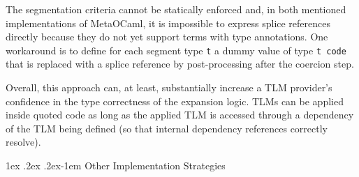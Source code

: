 \documentclass[acmsmall]{acmart}
\makeatletter
\renewcommand{\subsubsection}{%
  \@startsection{subsubsection}{3}%
  {\z@}{1ex \@plus .2ex \@minus .2ex}{-1em}%
  {\normalfont\normalsize\bfseries}%
}
\newcommand{\li}[1]{\lstinline[basicstyle=\ttfamily\fontsize{9pt}{1em}\selectfont]{#1}}
\makeatother
\begin{document}
The segmentation criteria cannot be statically enforced and, in both mentioned implementations of MetaOCaml, it is impossible to express splice references directly because they do not yet support terms with type annotations. One workaround is to define for each  segment type \li{t} a dummy value of type \li{t code} that is replaced with a splice reference by post-processing after the coercion step. 

Overall, this approach can, at least, substantially increase a TLM provider's confidence in the type correctness of the expansion logic. 
TLMs can be applied inside quoted code as long as the applied TLM is accessed through a dependency of the TLM being defined (so that internal dependency references correctly resolve). %

\subsubsection{Other Implementation Strategies}
\label{sec:html-example}
\end{document}
